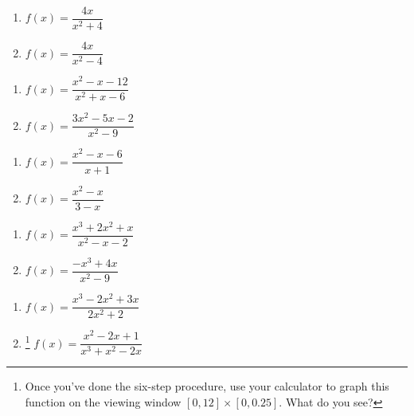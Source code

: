 \begin{multicols}{2}
\begin{enumerate}
\setcounter{enumi}{\value{HW}}

\item $f(x) = \dfrac{4x}{x^2+4}$
\item $f(x) = \dfrac{4x}{x^2-4}$

\setcounter{HW}{\value{enumi}}
\end{enumerate}
\end{multicols}

\begin{multicols}{2}
\begin{enumerate}
\setcounter{enumi}{\value{HW}}

\item $f(x) = \dfrac{x^2-x-12}{x^2+x-6}$
\item $f(x) = \dfrac{3x^2-5x-2}{x^2-9}$

\setcounter{HW}{\value{enumi}}
\end{enumerate}
\end{multicols}

\begin{multicols}{2}
\begin{enumerate}
\setcounter{enumi}{\value{HW}}

\item $f(x) = \dfrac{x^2-x-6}{x+1}$

\item $f(x) = \dfrac{x^2-x}{3-x}$

\setcounter{HW}{\value{enumi}}
\end{enumerate}
\end{multicols}

\begin{multicols}{2}
\begin{enumerate}
\setcounter{enumi}{\value{HW}}

\item $f(x) = \dfrac{x^3+2x^2+x}{x^2-x-2}$

\item $f(x) = \dfrac{-x^{3} + 4x}{x^{2} - 9}$

\setcounter{HW}{\value{enumi}}
\end{enumerate}
\end{multicols}

\begin{multicols}{2}
\begin{enumerate}
\setcounter{enumi}{\value{HW}}

\item  $f(x) = \dfrac{x^3-2x^2+3x}{2x^2+2}$

\item \hspace{-0.1in}\footnote{Once you've done the six-step procedure, use your calculator to graph this function on the viewing window $[0, 12] \times [0, 0.25]$.  What do you see?} $f(x) = \dfrac{x^{2} - 2x + 1}{x^{3} + x^{2} - 2x}$ \label{sixsteplast}

\setcounter{HW}{\value{enumi}}
\end{enumerate}
\end{multicols}


